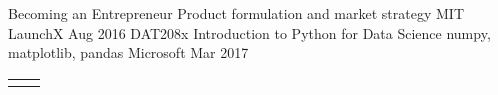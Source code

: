 

\begin{cvdiwrapper}

  \cvdateitem
    {Becoming an Entrepreneur} %
    {Product formulation and market strategy} %
    {MIT LaunchX} %
    {Aug 2016} %
   \cvdateitem
    {DAT208x Introduction to Python for Data Science} %
    {numpy, matplotlib, pandas} %
    {Microsoft} %
    {Mar 2017} %

\end{cvdiwrapper}



\vspace{\acvSectionContentTopSkip}
\vspace{-3.5mm}
\begin{center}
\setlength\tabcolsep{0pt}
\setlength{\extrarowheight}{0pt}
\begin{tabular*}{\textwidth}{C{2cm} L{\textwidth - 4.0cm}}

 & \\

\end{tabular*}
\end{center}


